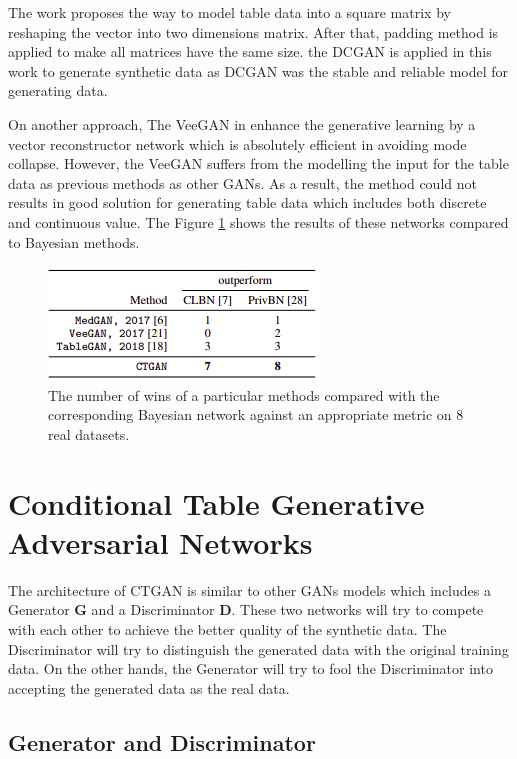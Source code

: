 \documentclass{article}
\begin{document}
The work \cite{park2018data} proposes the way to model table data into a square matrix by reshaping the vector into two dimensions matrix. After that, padding method is applied to make all matrices have the same size. the DCGAN is applied in this work to generate synthetic data as DCGAN was the stable and reliable model for generating data. 

On another approach, The VeeGAN in \cite{srivastava2017veegan} enhance the generative learning by a vector reconstructor network which is absolutely efficient in avoiding mode collapse. However, the VeeGAN suffers from the modelling the input for the table data as previous methods as other \ac{GANs}. As a result, the method could not results in good solution for generating table data which includes both discrete and continuous value.  The Figure \ref{fig:background} shows the results of these networks compared to Bayesian methods. 

\begin{figure}[h]
	\centering
	\includegraphics[scale=0.8]{figures/background.png}
	\caption{The number of wins of a particular methods compared with the corresponding Bayesian network against an appropriate metric on 8 real datasets. \cite{xu2019modeling}}
	\label{fig:background}
\end{figure}

\section{Conditional Table Generative Adversarial Networks}\label{ktcs}

The architecture of \ac{CTGAN} is similar to other \ac{GANs} models which includes a Generator $\mathbf{G}$ and a Discriminator $\mathbf{D}$. These two networks will try to compete with each other to achieve the better quality of the synthetic data. The Discriminator will try to distinguish the generated data with the original training data. On the other hands, the Generator will try to fool the Discriminator into accepting the generated data as the real data. 

\subsection{Generator and Discriminator}\label{subsec:gendis}
\end{document}
